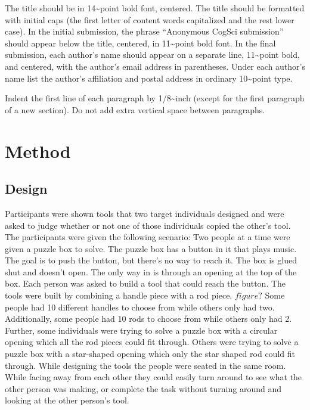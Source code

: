 \documentclass[10pt, letterpaper]{article}
\begin{document}
The title should be in 14\textasciitilde{}point bold font, centered. The
title should be formatted with initial caps (the first letter of content
words capitalized and the rest lower case). In the initial submission,
the phrase ``Anonymous CogSci submission'' should appear below the
title, centered, in 11\textasciitilde{}point bold font. In the final
submission, each author's name should appear on a separate line,
11\textasciitilde{}point bold, and centered, with the author's email
address in parentheses. Under each author's name list the author's
affiliation and postal address in ordinary 10\textasciitilde{}point
type.

Indent the first line of each paragraph by 1/8\textasciitilde{}inch
(except for the first paragraph of a new section). Do not add extra
vertical space between paragraphs.

\section{Method}\label{method}

\subsection{Design}\label{design}

Participants were shown tools that two target individuals designed and
were asked to judge whether or not one of those individuals copied the
other's tool. The participants were given the following scenario: Two
people at a time were given a puzzle box to solve. The puzzle box has a
button in it that plays music. The goal is to push the button, but
there's no way to reach it. The box is glued shut and doesn't open. The
only way in is through an opening at the top of the box. Each person was
asked to build a tool that could reach the button. The tools were built
by combining a handle piece with a rod piece. \(figure?\) Some people
had 10 different handles to choose from while others only had two.
Additionally, some people had 10 rods to choose from while others only
had 2. Further, some individuals were trying to solve a puzzle box with
a circular opening which all the rod pieces could fit through. Others
were trying to solve a puzzle box with a star-shaped opening which only
the star shaped rod could fit through. While designing the tools the
people were seated in the same room. While facing away from each other
they could easily turn around to see what the other person was making,
or complete the task without turning around and looking at the other
person's tool.
\end{document}
